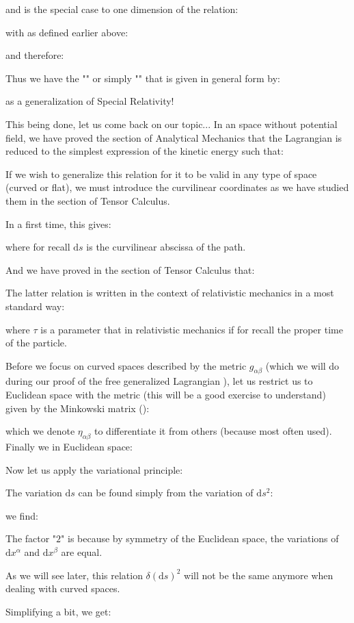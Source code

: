 	and is the special case to one dimension of the relation:
	
	with as defined earlier above:
	
	and therefore:
	
	Thus we have the "" or simply "" that is given in general form by:
	
	as a generalization of Special Relativity!

	This being done, let us come back on our topic... In an space without potential field, we have proved the section of Analytical Mechanics that the Lagrangian is reduced to the simplest expression of the kinetic energy such that:
	
	If we wish to generalize this relation for it to be valid in any type of space (curved or flat), we must introduce the curvilinear coordinates as we have studied them in the section of Tensor Calculus.

	In a first time, this gives:
	
	where for recall $\mathrm{d}s$ is the curvilinear abscissa of the path.
	
	And we have proved in the section of Tensor Calculus that:
	
	The latter relation is written in the context of relativistic mechanics in a most standard way:
	
	where $\tau$ is a parameter that in relativistic mechanics if for recall the proper time of the particle.
	
	Before we focus on curved spaces described by the metric $g_{\alpha\beta}$ (which we will do during our proof of the free generalized Lagrangian ), let us restrict us to Euclidean space with the metric (this will be a good exercise to understand) given by the Minkowski matrix ():
	
	which we denote $\eta_{\alpha\beta}$ to differentiate it from others (because most often used). Finally we in Euclidean space:
	
	Now let us apply the variational principle:
	
	The variation $\mathrm{d}s$ can be found simply from the variation of $\mathrm{d}s^2$:
	
	we find:
	
	The factor "$2$" is because by symmetry of the Euclidean space, the variations of $\mathrm{d}x^\alpha$ and $\mathrm{d}x^\beta$ are equal. 
	\begin{tcolorbox}[title=Remark,colframe=black,arc=10pt]
	As we will see later, this relation $\delta(\mathrm{d}s)^2$ will not be the same anymore when dealing with curved spaces.
	\end{tcolorbox}
	Simplifying a bit, we get:
	

